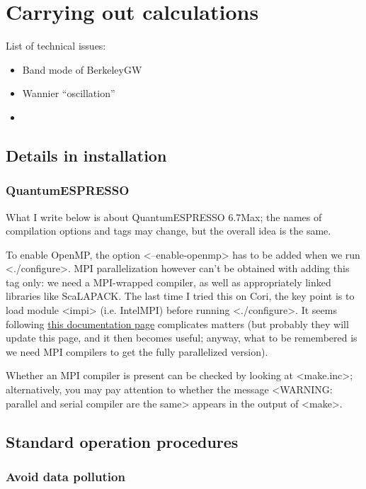 \documentclass[hyperref, a4paper, 12pt]{report}
\def\texttt#1{<#1>}%
\newcommand{\shortcode}[1]{\texttt{#1}}
\begin{document}
\chapter{Carrying out calculations}

List of technical issues:
\begin{itemize}
    \item Band mode of BerkeleyGW
    \item Wannier ``oscillation''
    \item 
\end{itemize}

\section{Details in installation}

\subsection{QuantumESPRESSO}\label{sec:qe-install}

What I write below is about QuantumESPRESSO 6.7Max; 
the names of compilation options and tags may change, 
but the overall idea is the same. 

To enable OpenMP, 
the option \shortcode{--enable-openmp} has to be added 
when we run \shortcode{./configure}.
MPI parallelization however can't be obtained with adding this tag only: 
we need a MPI-wrapped compiler,
as well as appropriately linked libraries like ScaLAPACK. 
The last time I tried this on Cori, 
the key point is to load module \shortcode{impi} 
(i.e. IntelMPI) before running \shortcode{./configure}.
It seems following \href{https://docs.nersc.gov/applications/quantum-espresso/}{this documentation page}
complicates matters 
(but probably they will update this page, and it then becomes useful;
anyway, what to be remembered is we need MPI compilers 
to get the fully parallelized version).

Whether an MPI compiler is present can be checked by looking at \shortcode{make.inc}; 
alternatively, you may pay attention to whether the message 
\shortcode{WARNING: parallel and serial compiler are the same}
appears in the output of \shortcode{make}.

\section{Standard operation procedures}

\subsection{Avoid data pollution}
\end{document}
